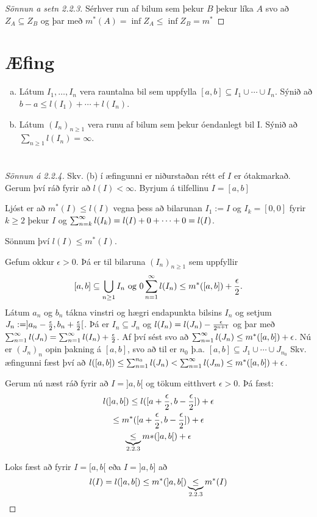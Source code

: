 \documentclass[12pt]{book}
\begin{document}
\begin{proof}[Sönnun a setn 2.2.3] Sérhver run af bilum sem þekur $B$ þekur líka $A$ svo að $Z_A \subseteq Z_B$ og þar með $m^{*}(A) = \inf{Z_A} \leq \inf{Z_B} = m^{*}$
\end{proof}

\section*{Æfing}
\begin{enumerate}[(a)]
    \item Látum $I_1, \dotsc, I_n$ vera rauntalna bil sem uppfylla $[a,b] \subseteq I_1 \cup \dotsb \cup I_n$. Sýnið að $b - a \leq l(I_1) + \dotsb + l(I_n)$.
    \item Látum $(I_n)_{n \geq 1}$ vera runu af bilum sem þekur óendanlegt bil I. Sýnið að $\sum_{n \geq 1} l(I_n) = \infty$.
\end{enumerate}


\section*{}
\begin{proof}[Sönnun á 2.2.4]
    Skv. (b) í æfingunni er niðurstaðan rétt ef $I$ er ótakmarkað. Gerum því ráð fyrir að $l(I) < \infty$. Byrjum á tilfellinu $I = [a,b]$

    \begin{ath}
        Ljóst er að $m^{*}(I) \leq l(I)$ vegna þess að bilarunan $I_1 := I$ og $I_k = [0,0]$
        fyrir $k \geq 2$ þekur $I$ og $\sum_{n = {k}}^{\infty} l(I_k) = l(I) + 0 + \dotsb + 0 = l(I)$.
        
        Sönnum því $l(I) \leq m^{*} (I)$.
    \end{ath}
    Gefum okkur $\epsilon > 0$. Þá er til bilaruna $(I_n)_{n \geq 1}$ sem uppfyllir
    \[[a,b] \subseteq \bigcup_{n \geq 1} I_n \text{ og } 0 \sum_{n = 1}^{\infty} l(I_n) \leq m^{*}([a,b]) + \frac{\epsilon}{2}.\]
    Látum $a_n$ og $b_n$ tákna vinstri og hægri endapunkta bilsins $I_n$ og setjum $J_n := ]a_n - \frac{\epsilon}{2}, b_n + \frac{\epsilon}{2}[$.
    Þá er $I_n \subseteq J_n$ og $l(I_n) = l(J_n) - \frac{\epsilon}{2^{n+1}}$ og þar með $\sum_{n = 1}^{\infty} l(J_n) = \sum_{n = 1}^{\infty} l(I_n) + \frac{\epsilon}{2}$.
    Af því sést svo að $\sum_{n = 1}^{\infty} l(J_n) \leq m^{*}([a,b]) + \epsilon$.
    Nú er $(J_n)_n$ opin þakning á $[a,b]$, svo að til er $n_0$ þ.a. $[a,b] \subseteq J_1 \cup \dotsb \cup J_{n_0}$
    Skv. æfingunni fæst því að $l([a,b]) \leq \sum_{n =1}^{n_0} l(J_n) < \sum_{n = 1}^{\infty} l(J_m) \leq m^{*} ([a,b]) + \epsilon$.

    Gerum nú næst ráð fyrir að $I = ]a,b[$ og tökum eitthvert $\epsilon > 0$. Þá fæst:
    \begin{gather*}
      l(]a,b[)  \leq l([a + \frac{\epsilon}{2}, b - \frac{\epsilon}{2}]) + \epsilon \\
      \leq m^{*}([a + \frac{\epsilon}{2}, b - \frac{\epsilon}{2}]) + \epsilon \\
      \underbrace{\leq}_{\text{2.2.3}} m{*}(]a,b[) + \epsilon
    \end{gather*}


    Loks fæst að fyrir $I = [a,b[$ eða $I = ]a,b]$ að
    \[l(I) = l(]a,b[) \leq m^*(]a,b[) \underbrace{\leq}_{\text{2.2.3}} m^*(I)\]
\end{proof}
\end{document}
